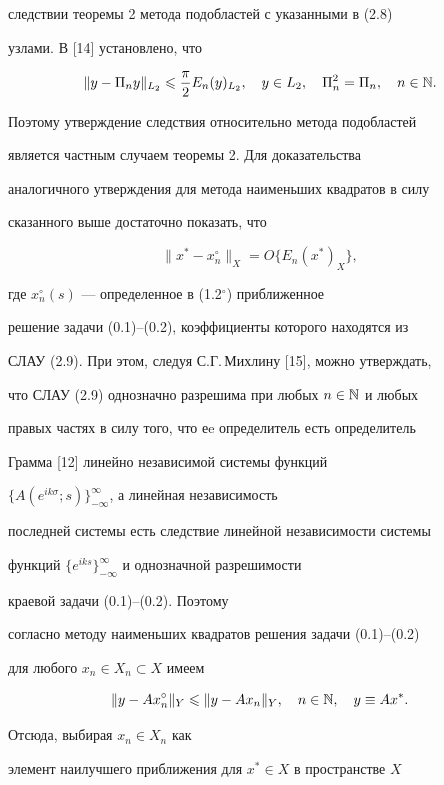 следствии теоремы 2 метода подобластей с указанными в (2.8)


узлами. В [14] установлено, что


$$


\|y - \Pi_n y\|_{L_2} \lea \frac{\pi}{2} E_n(y)_{L_2},\quad y\in


L_2,\quad \Pi_n^2 = \Pi_n,\quad n\in\N.


$$


Поэтому утверждение следствия относительно метода подобластей


является частным случаем теоремы 2. Для доказательства


аналогичного утверждения для метода наименьших квадратов в силу


сказанного выше достаточно показать, что


$$


\|x^* - x^\circ_n\|_X = O\{E_n(x^*)_X\},


$$


где $x_n^\circ(s)$ --- определенное в (1.2$^\circ$) приближенное


решение задачи (0.1)--(0.2), коэффициенты которого находятся из


СЛАУ (2.9). При этом, следуя С.Г.\,Михлину [15], можно утверждать,


что СЛАУ (2.9) однозначно разрешима при любых $n\in\Bbb {N}$ и любых


правых частях в силу того, что еe определитель есть определитель


Грамма [12] линейно независимой системы функций


$\{A(e^{ik\sigma};s)\}^\infty_{-\infty}$, а линейная независимость


последней системы есть следствие линейной независимости системы


функций $\{e^{iks}\}^\infty_{-\infty}$ и однозначной разрешимости


краевой задачи (0.1)--(0.2). Поэтому


согласно методу наименьших квадратов решения задачи (0.1)--(0.2)


для любого $x_n\in X_n\subset X$ имеем


$$


\|y - Ax_n^\circ\|_Y \lea \|y - Ax_n\|_Y,\quad n\in \N,\quad


y\equiv Ax^*.


$$


Отсюда, выбирая $x_n\in X_n$ как


элемент наилучшего приближения для $x^*\in X$  в пространстве $X$


